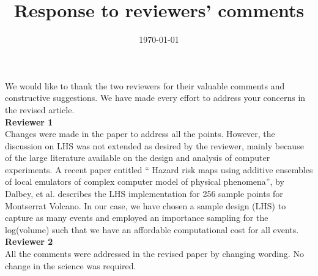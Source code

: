 \documentclass[12pt]{article}
\title{ Response to reviewers' comments}
\author{}
\date{\today}
\begin{document}
\maketitle

We would like to thank the two reviewers for their valuable comments and constructive suggestions. We have made every effort to address your 
concerns in the revised article. \\


\textbf{Reviewer 1} \\

Changes were made in the paper to address all the points. However, the discussion on  LHS was not extended as desired by the reviewer, mainly because of the large
literature available on the design and analysis of computer experiments. A recent paper entitled `` Hazard risk maps using additive ensembles of local emulators of
complex computer model of physical phenomena'', by Dalbey, et al. describes the LHS implementation for 256 sample points for Montserrat Volcano.
In our case, we have chosen a sample design (LHS) to capture as many events and employed an importance sampling for the log(volume) such that we have an affordable computational cost for all events.\\

\textbf{Reviewer 2}\\
All the comments were addressed in the revised paper by changing wording.  No change in the science was required. 
\end{document}
